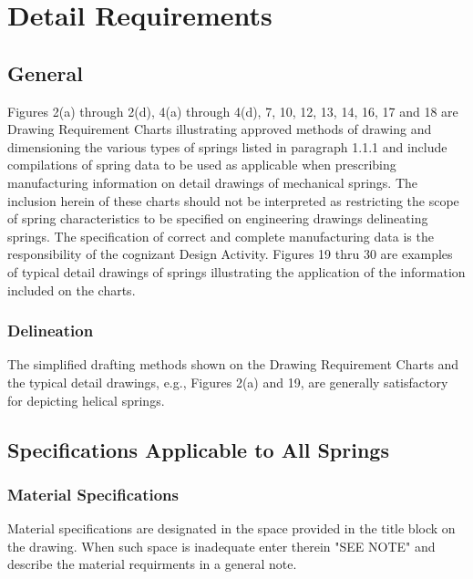\documentclass[10pt]{article}
\begin{document}
\section{Detail Requirements}

\subsection{General}
Figures 2(a) through 2(d), 4(a) through 4(d), 7, 10, 12, 13, 14, 16, 17 and 18 are Drawing Requirement Charts illustrating approved methods of drawing and dimensioning the various types of springs listed in paragraph 1.1.1 and include compilations of spring data to be used as applicable when prescribing manufacturing information on detail drawings of mechanical springs. 
The inclusion herein of these charts should not be interpreted as restricting the scope of spring characteristics to be specified on engineering drawings delineating springs. 
The specification of correct and complete manufacturing data is the responsibility of the cognizant Design Activity.
Figures 19 thru 30 are examples of typical detail drawings of springs illustrating the application of the information included on the charts.

\subsubsection{Delineation}
The simplified drafting methods shown on the Drawing Requirement Charts and the typical detail drawings, e.g., Figures 2(a) and 19, are generally satisfactory for depicting helical springs.

\subsection{Specifications Applicable to All Springs}

\subsubsection{Material Specifications}
Material specifications are designated in the space provided in the title block on the drawing. 
When such space is inadequate enter therein "SEE NOTE" and describe the material requirments in a general note.
\end{document}
